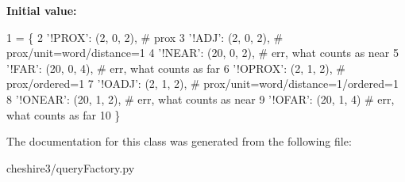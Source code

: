 {\bfseries Initial value\-:}
\begin{DoxyCode}
1 = \{
2                     \textcolor{stringliteral}{'!PROX'}: (2, 0, 2),  \textcolor{comment}{# prox}
3                     \textcolor{stringliteral}{'!ADJ'}: (2, 0, 2),   \textcolor{comment}{# prox/unit=word/distance=1}
4                     \textcolor{stringliteral}{'!NEAR'}: (20, 0, 2),  \textcolor{comment}{# err, what counts as near}
5                     \textcolor{stringliteral}{'!FAR'}: (20, 0, 4),  \textcolor{comment}{# err, what counts as far}
6                     \textcolor{stringliteral}{'!OPROX'}: (2, 1, 2),  \textcolor{comment}{# prox/ordered=1}
7                     \textcolor{stringliteral}{'!OADJ'}: (2, 1, 2),  \textcolor{comment}{# prox/unit=word/distance=1/ordered=1}
8                     \textcolor{stringliteral}{'!ONEAR'}: (20, 1, 2),  \textcolor{comment}{# err, what counts as near}
9                     \textcolor{stringliteral}{'!OFAR'}: (20, 1, 4)  \textcolor{comment}{# err, what counts as far}
10                     \}
\end{DoxyCode}


The documentation for this class was generated from the following file\-:\begin{DoxyCompactItemize}
\item 
cheshire3/query\-Factory.\-py\end{DoxyCompactItemize}
